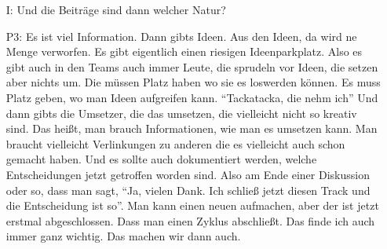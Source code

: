 \begin{itemize}
    \item[I:] Und die Beitr{\"a}ge sind dann welcher Natur?
    \item[P3:] Es ist viel Information. Dann gibts Ideen. Aus den Ideen, da wird ne Menge verworfen. Es gibt eigentlich einen riesigen Ideenparkplatz. Also es gibt auch in den Teams auch immer Leute, die sprudeln vor Ideen, die setzen aber nichts um. Die m{\"u}ssen Platz haben wo sie es loswerden k{\"o}nnen. Es muss Platz geben, wo man Ideen aufgreifen kann. "`Tackatacka, die nehm ich"' Und dann gibts die Umsetzer, die das umsetzen, die vielleicht nicht so kreativ sind. Das hei{\ss}t, man brauch Informationen, wie man es umsetzen kann. Man braucht vielleicht Verlinkungen zu anderen die es vielleicht auch schon gemacht haben. Und es sollte auch dokumentiert werden, welche Entscheidungen jetzt getroffen worden sind. Also am Ende einer Diskussion oder so, dass man sagt, "`Ja, vielen Dank. Ich schlie{\ss} jetzt diesen Track und die Entscheidung ist so"'. Man kann einen neuen aufmachen, aber der ist jetzt erstmal abgeschlossen. Dass man einen Zyklus abschlie{\ss}t. Das finde ich auch immer ganz wichtig. Das machen wir dann auch.
\end{itemize}

